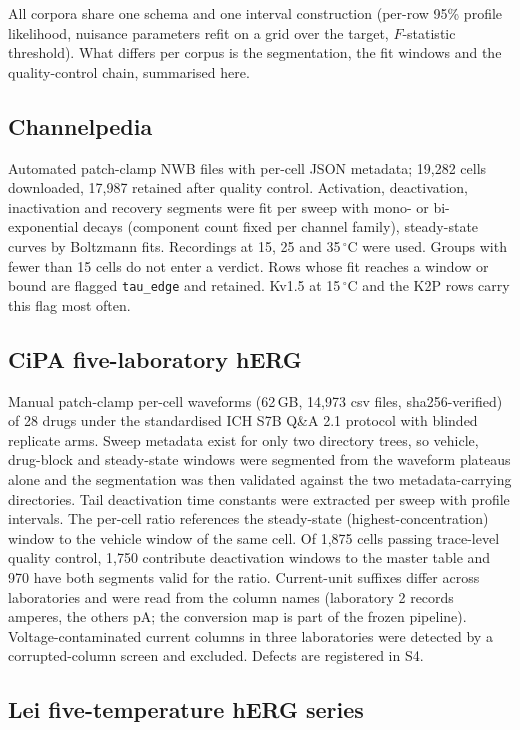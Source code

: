 \documentclass[11pt,a4paper]{article}
\begin{document}
All corpora share one schema and one interval construction (per-row 95\%
profile likelihood, nuisance parameters refit on a grid over the target,
$F$-statistic threshold). What differs per corpus is the segmentation, the fit
windows and the quality-control chain, summarised here.

\subsection{Channelpedia}

Automated patch-clamp NWB files with per-cell JSON metadata; 19,282 cells
downloaded, 17,987 retained after quality control. Activation, deactivation,
inactivation and recovery segments were fit per sweep with mono- or
bi-exponential decays (component count fixed per channel family), steady-state
curves by Boltzmann fits. Recordings at 15, 25 and 35\,$^\circ$C were used.
Groups with fewer than 15 cells do not enter a verdict. Rows whose fit reaches
a window or bound are flagged \texttt{tau\_edge} and retained. Kv1.5 at
15\,$^\circ$C and the K2P rows carry this flag most often.

\subsection{CiPA five-laboratory hERG}

Manual patch-clamp per-cell waveforms (62\,GB, 14{,}973 csv files,
sha256-verified) of 28 drugs under the standardised ICH S7B Q\&A 2.1 protocol
with blinded replicate arms. Sweep metadata exist for only two directory
trees, so vehicle, drug-block and steady-state windows were segmented from the
waveform plateaus alone and the segmentation was then validated against the
two metadata-carrying directories. Tail deactivation time constants were
extracted per sweep with profile intervals. The per-cell ratio references the
steady-state (highest-concentration) window to the vehicle window of the same
cell. Of 1,875 cells passing trace-level quality control, 1,750 contribute
deactivation windows to the master table and 970 have both segments valid for
the ratio. Current-unit suffixes differ across laboratories and were read from
the column names (laboratory 2 records amperes, the others pA; the conversion
map is part of the frozen pipeline). Voltage-contaminated current columns in
three laboratories were detected by a corrupted-column screen and excluded.
Defects are registered in S4.

\subsection{Lei five-temperature hERG series}
\end{document}
